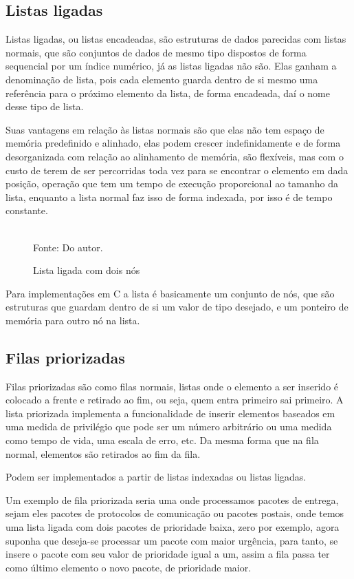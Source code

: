 \subsection{Listas ligadas}

Listas ligadas, ou listas encadeadas, são estruturas de dados parecidas com listas normais, que são conjuntos de dados de mesmo tipo dispostos de forma sequencial por um índice numérico, já as listas ligadas não são. Elas ganham a denominação de lista, pois cada elemento guarda dentro de si mesmo uma referência para o próximo elemento da lista, de forma encadeada, daí o nome desse tipo de lista. 

Suas vantagens em relação às listas normais são que elas não tem espaço de memória predefinido e alinhado, elas podem crescer indefinidamente e de forma desorganizada com relação ao alinhamento de memória, são flexíveis, mas com o custo de terem de ser percorridas toda vez para se encontrar o elemento em dada posição, operação que tem um tempo de execução proporcional ao tamanho da lista, enquanto a lista normal faz isso de forma indexada, por isso é de tempo constante.

\begin{figure}[ht]
	\centering
	\caption{Lista ligada com dois nós}
	\\
	\label{fig:linked}
	\footnotesize{Fonte: Do autor.}
\end{figure}

Para implementações em C a lista é basicamente um conjunto de nós, que são estruturas que guardam dentro de si um valor de tipo desejado, e um ponteiro de memória para outro nó na lista.

\subsection{Filas priorizadas}

Filas priorizadas são como filas normais, listas onde o elemento a ser inserido é colocado a frente e retirado ao fim, ou seja, quem entra primeiro sai primeiro. A lista priorizada implementa a funcionalidade de inserir elementos baseados em uma medida de privilégio que pode ser um número arbitrário ou uma medida como tempo de vida, uma escala de erro, etc. Da mesma forma que na fila normal, elementos são retirados ao fim da fila.

Podem ser implementados a partir de listas indexadas ou listas ligadas.

Um exemplo de fila priorizada seria uma onde processamos pacotes de entrega, sejam eles pacotes de protocolos de comunicação ou pacotes postais, onde temos uma lista ligada com dois pacotes de prioridade baixa, zero por exemplo, agora suponha que deseja-se processar um pacote com maior urgência, para tanto, se insere o pacote com seu valor de prioridade igual a um, assim a fila passa ter como último elemento o novo pacote, de prioridade maior.

